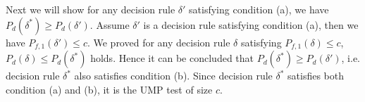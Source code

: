 Next we will show for any decision rule $\delta'$ satisfying condition (a), we have $P_d(\delta^\ast) \geq P_d(\delta')$.  
Assume $\delta'$ is a decision rule satisfying condition (a), then we have  $P_{f,1}(\delta') \leq c$.
We proved for any decision rule $\delta$ satisfying $P_{f, 1}(\delta) \leq c$, $P_d(\delta) \leq P_d(\delta^\ast)$ holds.  
Hence it  can be concluded that  $P_d(\delta^\ast) \geq P_d(\delta')$, i.e. 
decision rule $\delta^\ast$ also satisfies condition (b). Since decision rule $\delta^\ast$ satisfies both condition (a) and (b), it is the UMP test of size $c$.    



